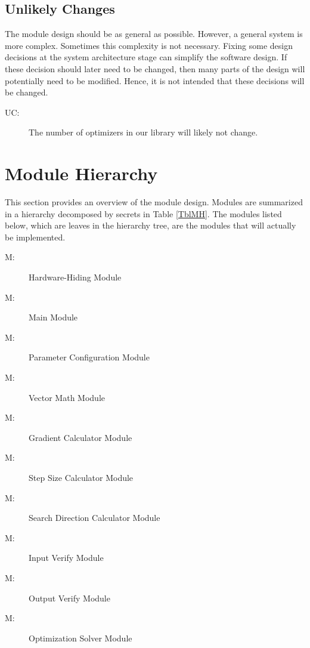 \documentclass[12pt, titlepage]{article}
\newcounter{ucnum}
\newcommand{\uctheucnum}{UC\theucnum}
\newcounter{mnum}
\newcommand{\mthemnum}{M\themnum}
\begin{document}
\subsection{Unlikely Changes} \label{SecUchange}

The module design should be as general as possible. However, a general system is
more complex. Sometimes this complexity is not necessary. Fixing some design
decisions at the system architecture stage can simplify the software design. If
these decision should later need to be changed, then many parts of the design
will potentially need to be modified. Hence, it is not intended that these
decisions will be changed.

\begin{description}
\item[ \uctheucnum \label{ucNumFunc}:] The number of optimizers in our library will likely not change.
\end{description}

\section{Module Hierarchy} \label{SecMH}

This section provides an overview of the module design. Modules are summarized
in a hierarchy decomposed by secrets in Table \ref{TblMH}. The modules listed
below, which are leaves in the hierarchy tree, are the modules that will
actually be implemented.

\begin{description}
\item [ \mthemnum \label{moduleHH}:] Hardware-Hiding Module
\item [ \mthemnum \label{moduleMain}:] Main Module
\item [ \mthemnum \label{moduleParamConfig}:] Parameter Configuration Module
\item [ \mthemnum \label{moduleVecMath}:] Vector Math Module
\item [ \mthemnum \label{moduleGradCalc}:] Gradient Calculator Module
\item [ \mthemnum \label{moduleStepSize}:] Step Size Calculator Module
\item [ \mthemnum \label{moduleSearchDir}:] Search Direction Calculator Module
\item [ \mthemnum \label{moduleInputVerify}:] Input Verify Module
\item [ \mthemnum \label{moduleOutputVerify}:] Output Verify Module
\item [ \mthemnum \label{moduleOptimizer}:] Optimization Solver Module
\end{description}
\end{document}
